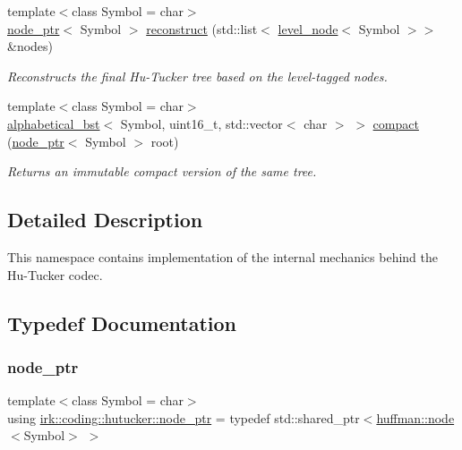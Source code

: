 \begin{DoxyCompactItemize}
\item 
{\footnotesize template$<$class Symbol  = char$>$ }\\\mbox{\hyperlink{namespaceirk_1_1coding_1_1hutucker_aa5d22cfdf05ffec38f2531e0307248fe}{node\+\_\+ptr}}$<$ Symbol $>$ \mbox{\hyperlink{namespaceirk_1_1coding_1_1hutucker_adf2fb7ba2277edb34df80da2766493f8}{reconstruct}} (std\+::list$<$ \mbox{\hyperlink{structirk_1_1coding_1_1hutucker_1_1level__node}{level\+\_\+node}}$<$ Symbol $>$$>$ \&nodes)
\begin{DoxyCompactList}\small\item\em Reconstructs the final Hu-\/\+Tucker tree based on the level-\/tagged nodes. \end{DoxyCompactList}\item 
{\footnotesize template$<$class Symbol  = char$>$ }\\\mbox{\hyperlink{classirk_1_1alphabetical__bst}{alphabetical\+\_\+bst}}$<$ Symbol, uint16\+\_\+t, std\+::vector$<$ char $>$ $>$ \mbox{\hyperlink{namespaceirk_1_1coding_1_1hutucker_a8439e61ebf9f3af2e42bce48905832b5}{compact}} (\mbox{\hyperlink{namespaceirk_1_1coding_1_1hutucker_aa5d22cfdf05ffec38f2531e0307248fe}{node\+\_\+ptr}}$<$ Symbol $>$ root)
\begin{DoxyCompactList}\small\item\em Returns an immutable compact version of the same tree. \end{DoxyCompactList}\end{DoxyCompactItemize}


\subsection{Detailed Description}
This namespace contains implementation of the internal mechanics behind the Hu-\/\+Tucker codec. 

\subsection{Typedef Documentation}
\mbox{\label{namespaceirk_1_1coding_1_1hutucker_aa5d22cfdf05ffec38f2531e0307248fe}} 
\subsubsection{\texorpdfstring{node\+\_\+ptr}{node\_ptr}}
{\footnotesize\ttfamily template$<$class Symbol  = char$>$ \\
using \mbox{\hyperlink{namespaceirk_1_1coding_1_1hutucker_aa5d22cfdf05ffec38f2531e0307248fe}{irk\+::coding\+::hutucker\+::node\+\_\+ptr}} = typedef std\+::shared\+\_\+ptr$<$\mbox{\hyperlink{structirk_1_1coding_1_1huffman_1_1node}{huffman\+::node}}$<$Symbol$>$ $>$}



